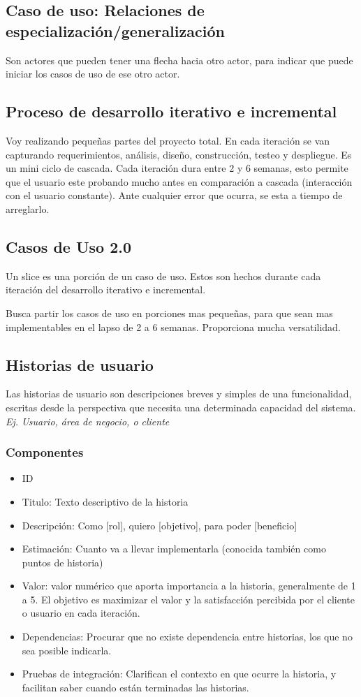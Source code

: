 \documentclass[titlepage,a4paper]{article}
\begin{document}
\subsection{Caso de uso: Relaciones de especialización/generalización}
Son actores que pueden tener una flecha hacia otro actor, para indicar que puede iniciar los casos de uso de ese otro actor.

\subsection{Proceso de desarrollo iterativo e incremental}
Voy realizando pequeñas partes del proyecto total. En cada iteración se van capturando requerimientos, análisis, diseño, construcción, testeo y despliegue. Es un mini ciclo de cascada. Cada iteración dura entre 2 y 6 semanas, esto permite que el usuario este probando mucho antes en comparación a cascada (interacción con el usuario constante). Ante cualquier error que ocurra, se esta a tiempo de arreglarlo.

\subsection{Casos de Uso 2.0}
Un slice es una porción de un caso de uso. Estos son hechos durante cada iteración del desarrollo iterativo e incremental.

Busca partir los casos de uso en porciones mas pequeñas, para que sean mas implementables en el lapso de 2 a 6 semanas. Proporciona mucha versatilidad.

\subsection{Historias de usuario}
Las historias de usuario son descripciones breves y simples de una funcionalidad, escritas desde la perspectiva que necesita una determinada capacidad del sistema. \textit{Ej. Usuario, área de negocio, o cliente}

\subsubsection*{Componentes}
\begin{itemize}
    \item ID
    \item Titulo: Texto descriptivo de la historia
    \item Descripción: Como [rol], quiero [objetivo], para poder [beneficio]
    \item Estimación: Cuanto va a llevar implementarla (conocida también como puntos de historia)
    \item Valor: valor numérico que aporta importancia a la historia, generalmente de 1 a 5. El objetivo es maximizar el valor y la satisfacción percibida por el cliente o usuario en cada iteración.
    \item Dependencias: Procurar que no existe dependencia entre historias, los que no sea posible indicarla.
    \item Pruebas de integración: Clarifican el contexto en que ocurre la historia, y facilitan saber cuando están terminadas las historias.
\end{itemize}
\end{document}
